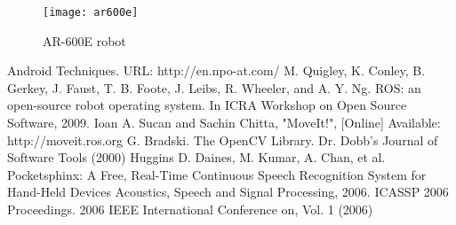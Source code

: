 \documentclass[letterpaper, 10 pt, conference]{ieeeconf}  %
\begin{document}
\begin{figure} [thpb]
      \centering

      \texttt{[image: ar600e]}
      \caption{AR-600E robot}
      \label{img:ar600e}
\end{figure}

\addtolength{\textheight}{-12cm}   %












\begin{thebibliography}{99}

 Android Techniques. URL: http://en.npo-at.com/
 M. Quigley, K. Conley, B. Gerkey, J. Faust, T. B. Foote, J. Leibs, R. Wheeler, and A. Y. Ng. ROS: an open-source robot operating system. In ICRA Workshop on Open Source Software, 2009.
 Ioan A. Sucan and Sachin Chitta, "MoveIt!", [Online] Available: http://moveit.ros.org
 G. Bradski. The OpenCV Library. Dr. Dobb’s Journal of Software
Tools (2000) 
 Huggins D. Daines, M. Kumar, A. Chan, et al. Pocketsphinx: A Free,
Real-Time Continuous Speech Recognition System for Hand-Held Devices Acoustics, Speech and Signal Processing, 2006. ICASSP 2006 Proceedings. 2006 IEEE International Conference on, Vol. 1 (2006)


\end{thebibliography}
\end{document}
